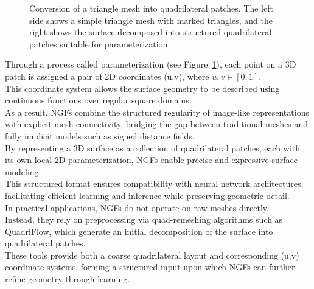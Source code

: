 \begin{figure}[ht]
        \caption{Conversion of a triangle mesh into quadrilateral patches. The left side shows a simple triangle mesh with marked triangles, and the right shows the surface decomposed into structured quadrilateral patches suitable for parameterization.}
        \label{fig:tri-to-quad}
\end{figure}

Through a process called parameterization (see Figure~\ref{fig:tri-to-quad}), each point on a 3D patch is assigned a pair of 2D coordinates (u,v), where \( u, v \in [0,1] \). \\
This coordinate system allows the surface geometry to be described using continuous functions over regular square domains. \\
As a result, NGFs combine the structured regularity of image-like representations with explicit mesh connectivity, bridging the gap between traditional meshes and fully implicit models such as signed distance fields. \\
By representing a 3D surface as a collection of quadrilateral patches, each with its own local 2D parameterization, NGFs enable precise and expressive surface modeling. \\
This structured format ensures compatibility with neural network architectures, facilitating efficient learning and inference while preserving geometric detail. \\

In practical applications, NGFs do not operate on raw meshes directly. \\
Instead, they rely on preprocessing via quad-remeshing algorithms such as QuadriFlow, which generate an initial decomposition of the surface into quadrilateral patches. \\
These tools provide both a coarse quadrilateral layout and corresponding (u,v) coordinate systems, forming a structured input upon which NGFs can further refine geometry through learning. 
    

